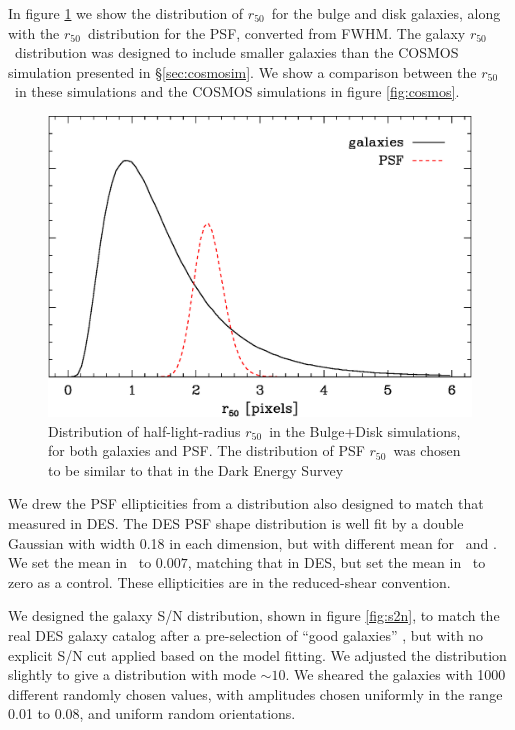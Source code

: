 \documentclass[usegraphicx,usenatbib]{mn2e}
\newcommand{\hlr}{$r_{50}$}
\begin{document}
In figure \ref{fig:psimhlrcompare} we show the distribution of \hlr\ for the
bulge and disk galaxies, along with the \hlr\ distribution for the PSF,
converted from FWHM.  The galaxy \hlr\ distribution was designed to include
smaller galaxies than the COSMOS simulation presented in \S \ref{sec:cosmosim}.
We show a comparison between the \hlr\ in these simulations and the COSMOS
simulations in figure \ref{fig:cosmos}.


\begin{figure}
    \centering
    \includegraphics[scale=0.45]{sim-bd29-r50.eps}

    \caption{Distribution of half-light-radius \hlr\ in the Bulge+Disk simulations,
        for both galaxies and PSF.  The distribution of PSF \hlr\ 
        was chosen to be similar to that in the 
        Dark Energy Survey}

\label{fig:psimhlrcompare}
\end{figure}


We drew the PSF ellipticities from a distribution also designed to match that
measured in DES.  The DES PSF shape distribution is well fit by a double
Gaussian with width 0.18 in each dimension, but with different mean for \eone\
and \etwo.  We set the mean in \etwo\ to $0.007$, matching that in DES, but set
the mean in \eone\ to zero as a control.  These ellipticities are in the
reduced-shear convention.  

We designed the galaxy S/N distribution, shown in figure \ref{fig:s2n}, to
match the real DES galaxy catalog after a pre-selection of ``good galaxies''
\citep{DESSVShear}, but with no explicit S/N cut applied based on the model
fitting.  We adjusted the distribution slightly to give a distribution with
mode $\sim10$.  We sheared the galaxies with 1000 different randomly chosen values,
with amplitudes chosen uniformly in the range 0.01 to 0.08, and uniform random
orientations.
\end{document}
